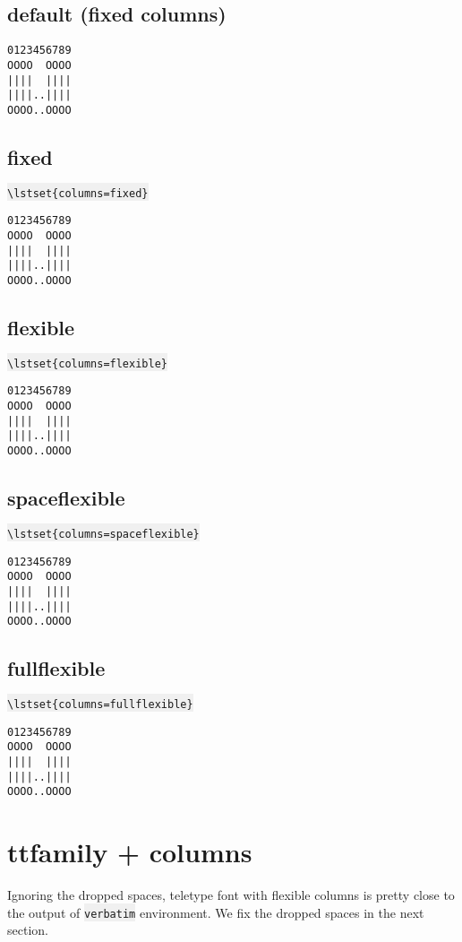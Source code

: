 \documentclass{article}
\newcommand{\bs}{\textbackslash}
\newcommand{\ttt}[1]{\colorbox[HTML]{f0f0f0}{\texttt{#1}}}
\begin{document}
\subsection{default (fixed columns)}
{
\begin{lstlisting}
0123456789
OOOO  OOOO
||||  ||||
||||..||||
OOOO..OOOO
\end{lstlisting}
}

\subsection{fixed}
\ttt{\bs{}lstset\{columns=fixed\}}

{
\lstset{columns=fixed}
\begin{lstlisting}
0123456789
OOOO  OOOO
||||  ||||
||||..||||
OOOO..OOOO
\end{lstlisting}
}

\subsection{flexible}
\ttt{\bs{}lstset\{columns=flexible\}}

{
\lstset{columns=flexible}
\begin{lstlisting}
0123456789
OOOO  OOOO
||||  ||||
||||..||||
OOOO..OOOO
\end{lstlisting}
}

\subsection{spaceflexible}
\ttt{\bs{}lstset\{columns=spaceflexible\}}

{
\lstset{columns=spaceflexible}
\begin{lstlisting}
0123456789
OOOO  OOOO
||||  ||||
||||..||||
OOOO..OOOO
\end{lstlisting}
}

\subsection{fullflexible}
\ttt{\bs{}lstset\{columns=fullflexible\}}

{
\lstset{columns=fullflexible}
\begin{lstlisting}
0123456789
OOOO  OOOO
||||  ||||
||||..||||
OOOO..OOOO
\end{lstlisting}
}
\pagebreak


\section{ttfamily + columns}
Ignoring the dropped spaces, teletype font with flexible columns is
pretty close to the output of \ttt{verbatim} environment. We fix the
dropped spaces in the next section.
\end{document}

